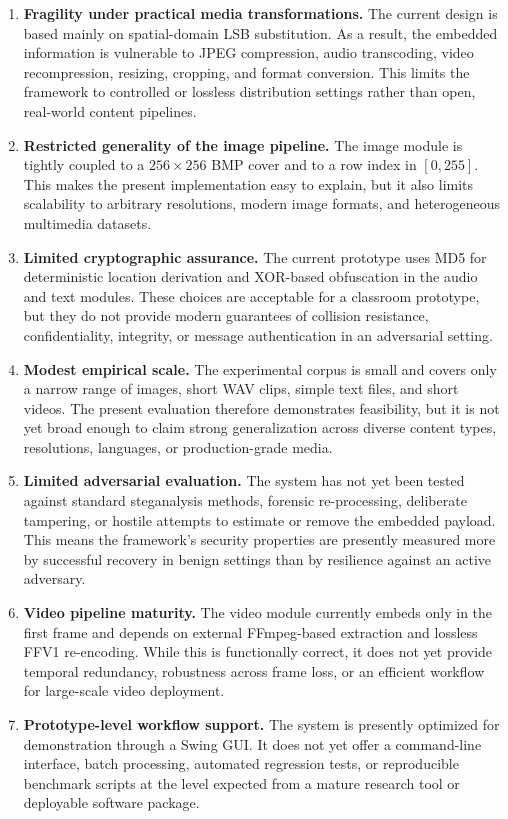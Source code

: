 \begin{enumerate}[label=\textbf{L\arabic*.}]
    \item \textbf{Fragility under practical media transformations.} The current design is based mainly on spatial-domain LSB substitution. As a result, the embedded information is vulnerable to JPEG compression, audio transcoding, video recompression, resizing, cropping, and format conversion. This limits the framework to controlled or lossless distribution settings rather than open, real-world content pipelines.
    \item \textbf{Restricted generality of the image pipeline.} The image module is tightly coupled to a $256 \times 256$ BMP cover and to a row index in $[0,255]$. This makes the present implementation easy to explain, but it also limits scalability to arbitrary resolutions, modern image formats, and heterogeneous multimedia datasets.
    \item \textbf{Limited cryptographic assurance.} The current prototype uses MD5 for deterministic location derivation and XOR-based obfuscation in the audio and text modules. These choices are acceptable for a classroom prototype, but they do not provide modern guarantees of collision resistance, confidentiality, integrity, or message authentication in an adversarial setting.
    \item \textbf{Modest empirical scale.} The experimental corpus is small and covers only a narrow range of images, short WAV clips, simple text files, and short videos. The present evaluation therefore demonstrates feasibility, but it is not yet broad enough to claim strong generalization across diverse content types, resolutions, languages, or production-grade media.
    \item \textbf{Limited adversarial evaluation.} The system has not yet been tested against standard steganalysis methods, forensic re-processing, deliberate tampering, or hostile attempts to estimate or remove the embedded payload. This means the framework's security properties are presently measured more by successful recovery in benign settings than by resilience against an active adversary.
    \item \textbf{Video pipeline maturity.} The video module currently embeds only in the first frame and depends on external FFmpeg-based extraction and lossless FFV1 re-encoding. While this is functionally correct, it does not yet provide temporal redundancy, robustness across frame loss, or an efficient workflow for large-scale video deployment.
    \item \textbf{Prototype-level workflow support.} The system is presently optimized for demonstration through a Swing GUI. It does not yet offer a command-line interface, batch processing, automated regression tests, or reproducible benchmark scripts at the level expected from a mature research tool or deployable software package.
\end{enumerate}

